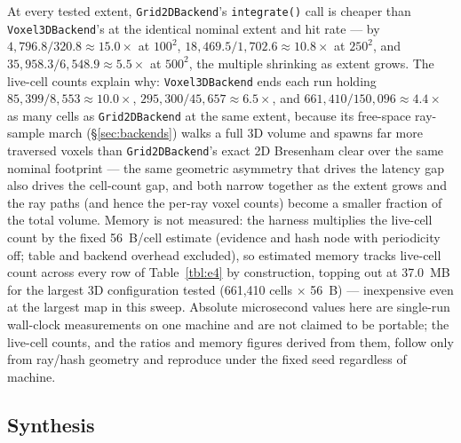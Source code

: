 \documentclass[conference]{IEEEtran}
\begin{document}
At every tested extent, \texttt{Grid2DBackend}'s \texttt{integrate()} call is cheaper than
\texttt{Voxel3DBackend}'s at the identical nominal extent and hit rate --- by
$4{,}796.8/320.8\approx15.0\times$ at $100^2$, $18{,}469.5/1{,}702.6\approx
10.8\times$ at $250^2$, and $35{,}958.3/6{,}548.9\approx5.5\times$ at
$500^2$, the multiple shrinking as extent grows. The live-cell counts
explain why: \texttt{Voxel3DBackend} ends each run holding
$85{,}399/8{,}553\approx10.0\times$, $295{,}300/45{,}657\approx6.5\times$,
and $661{,}410/150{,}096\approx4.4\times$ as many cells as \texttt{Grid2DBackend}
at the same extent, because its free-space ray-sample march (\S\ref{sec:backends}) walks a
full 3D volume and spawns far more traversed voxels than \texttt{Grid2DBackend}'s
exact 2D Bresenham clear over the same nominal footprint --- the same
geometric asymmetry that drives the latency gap also drives the cell-count
gap, and both narrow together as the extent grows and the ray paths (and
hence the per-ray voxel counts) become a smaller fraction of the total
volume. Memory is not measured: the harness multiplies the live-cell count by
the fixed 56~B/cell estimate (evidence and hash node with periodicity off;
table and backend overhead excluded), so estimated memory tracks live-cell
count across every row of Table~\ref{tbl:e4} by construction, topping out at 37.0~MB for the largest 3D
configuration tested (661,410 cells $\times$ 56~B) --- inexpensive even at
the largest map in this sweep. Absolute microsecond values here are
single-run wall-clock measurements on one machine and are not claimed to be
portable; the live-cell counts, and the ratios and memory figures derived
from them, follow only from ray/hash geometry and reproduce under the fixed
seed regardless of machine.

\subsection{Synthesis}
\end{document}
